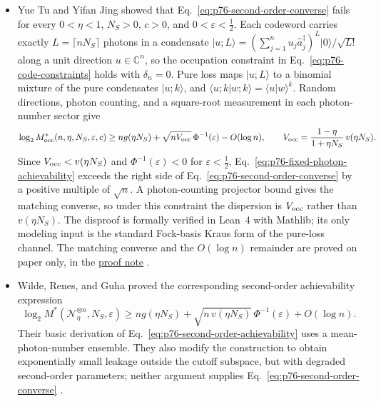 \begin{itemize}
  \item Yue Tu and Yifan Jing showed that Eq.~\eqref{eq:p76-second-order-converse}
fails for every $0<\eta<1$, $N_S>0$, $c>0$, and $0<\varepsilon<\tfrac12$.
Each codeword carries exactly $L=\lceil nN_S\rceil$ photons in a condensate
$\lvert u;L\rangle=(\sum_{j=1}^n u_j\hat a_j^\dagger)^L\lvert0\rangle/\sqrt{L!}$
along a unit direction $u\in\mathbb C^n$, so the occupation constraint in
Eq.~\eqref{eq:p76-code-constraints} holds with $\delta_n=0$.  Pure loss maps
$\lvert u;L\rangle$ to a binomial mixture of the pure condensates
$\lvert u;k\rangle$, and $\langle u;k\vert w;k\rangle=\langle u\vert w\rangle^k$.
Random directions, photon counting, and a square-root measurement in each
photon-number sector give
\begin{equation}
  \log_2 M^*_{\rm occ}(n,\eta,N_S,\varepsilon,c)
  \geq ng(\eta N_S)+\sqrt{n V_{\rm occ}}\,\Phi^{-1}(\varepsilon)-O(\log n),
  \qquad
  V_{\rm occ}=\frac{1-\eta}{1+\eta N_S}\,v(\eta N_S).
  \label{eq:p76-fixed-photon-achievability}
\end{equation}
Since $V_{\rm occ}<v(\eta N_S)$ and $\Phi^{-1}(\varepsilon)<0$ for
$\varepsilon<\tfrac12$, Eq.~\eqref{eq:p76-fixed-photon-achievability} exceeds
the right side of Eq.~\eqref{eq:p76-second-order-converse} by a positive
multiple of $\sqrt n$.  A photon-counting projector bound gives the matching
converse, so under this constraint the dispersion is $V_{\rm occ}$ rather
than $v(\eta N_S)$.  The disproof is formally verified in Lean~4 with
Mathlib; its only modeling input is the standard Fock-basis Kraus form of the
pure-loss channel.  The matching converse and the $O(\log n)$ remainder are
proved on paper only, in the
\href{https://github.com/Naixu-Guo/quantum-open-problems/blob/main/database/proofs/pure-loss-second-order.md}{proof note}
.

  \item Wilde, Renes, and Guha proved the corresponding second-order
  achievability expression
  \begin{equation}
    \log_2 M^*(\mathcal N_\eta^{\otimes n},N_S,\varepsilon)
    \geq ng(\eta N_S)
      +\sqrt{n\,v(\eta N_S)}\,\Phi^{-1}(\varepsilon)
      +O(\log n).
    \label{eq:p76-second-order-achievability}
  \end{equation}
  Their basic derivation of
  Eq.~\eqref{eq:p76-second-order-achievability} uses a mean-photon-number
  ensemble.  They also modify the construction to obtain exponentially small
  leakage outside the cutoff subspace, but with degraded second-order
  parameters; neither argument supplies
  Eq.~\eqref{eq:p76-second-order-converse}
  .


\end{itemize}
